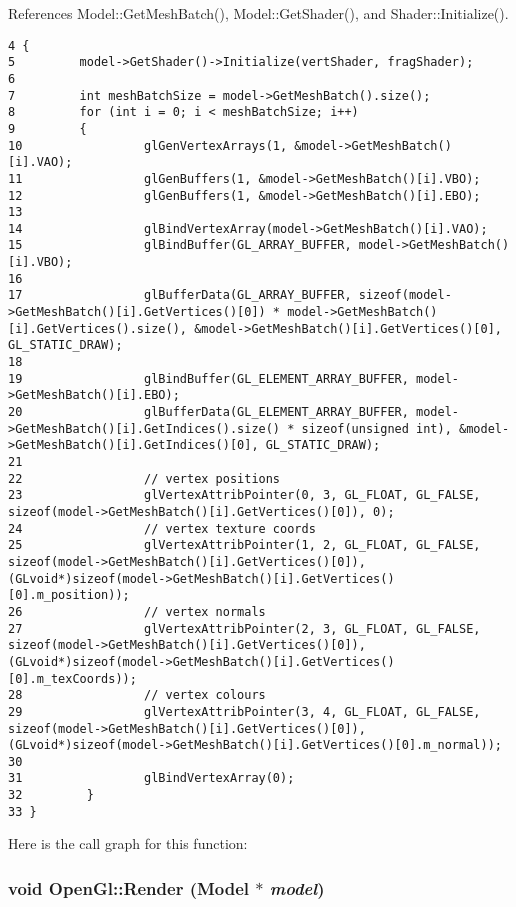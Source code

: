 References Model::GetMeshBatch(), Model::GetShader(), and Shader::Initialize().

\begin{Code}\begin{verbatim}4 {
5         model->GetShader()->Initialize(vertShader, fragShader);
6 
7         int meshBatchSize = model->GetMeshBatch().size();
8         for (int i = 0; i < meshBatchSize; i++)
9         {
10                 glGenVertexArrays(1, &model->GetMeshBatch()[i].VAO);
11                 glGenBuffers(1, &model->GetMeshBatch()[i].VBO);
12                 glGenBuffers(1, &model->GetMeshBatch()[i].EBO);
13 
14                 glBindVertexArray(model->GetMeshBatch()[i].VAO);
15                 glBindBuffer(GL_ARRAY_BUFFER, model->GetMeshBatch()[i].VBO);
16 
17                 glBufferData(GL_ARRAY_BUFFER, sizeof(model->GetMeshBatch()[i].GetVertices()[0]) * model->GetMeshBatch()[i].GetVertices().size(), &model->GetMeshBatch()[i].GetVertices()[0], GL_STATIC_DRAW);
18 
19                 glBindBuffer(GL_ELEMENT_ARRAY_BUFFER, model->GetMeshBatch()[i].EBO);
20                 glBufferData(GL_ELEMENT_ARRAY_BUFFER, model->GetMeshBatch()[i].GetIndices().size() * sizeof(unsigned int), &model->GetMeshBatch()[i].GetIndices()[0], GL_STATIC_DRAW);
21 
22                 // vertex positions
23                 glVertexAttribPointer(0, 3, GL_FLOAT, GL_FALSE, sizeof(model->GetMeshBatch()[i].GetVertices()[0]), 0);
24                 // vertex texture coords
25                 glVertexAttribPointer(1, 2, GL_FLOAT, GL_FALSE, sizeof(model->GetMeshBatch()[i].GetVertices()[0]), (GLvoid*)sizeof(model->GetMeshBatch()[i].GetVertices()[0].m_position));
26                 // vertex normals
27                 glVertexAttribPointer(2, 3, GL_FLOAT, GL_FALSE, sizeof(model->GetMeshBatch()[i].GetVertices()[0]), (GLvoid*)sizeof(model->GetMeshBatch()[i].GetVertices()[0].m_texCoords));
28                 // vertex colours
29                 glVertexAttribPointer(3, 4, GL_FLOAT, GL_FALSE, sizeof(model->GetMeshBatch()[i].GetVertices()[0]), (GLvoid*)sizeof(model->GetMeshBatch()[i].GetVertices()[0].m_normal));
30 
31                 glBindVertexArray(0);
32         }
33 }
\end{verbatim}
\end{Code}




Here is the call graph for this function:\hypertarget{class_open_gl_5ee37b305288c0640f6c370bc7fc1192}{
\subsubsection[Render]{\setlength{\rightskip}{0pt plus 5cm}void OpenGl::Render ({\bf Model} $\ast$ {\em model})}}
\label{class_open_gl_5ee37b305288c0640f6c370bc7fc1192}


